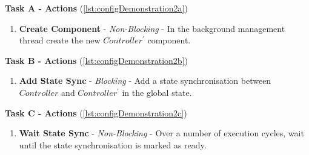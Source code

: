 \textbf{Task A - Actions} (\autoref{lst:configDemonstration2a})
 \begin{enumerate}
    \item \textbf{Create Component} - \textit{Non-Blocking} - In the background management thread create the new $Controller^{\prime}$ component.
\end{enumerate}

\textbf{Task B - Actions} (\autoref{lst:configDemonstration2b})
 \begin{enumerate}
    \item \textbf{Add State Sync} - \textit{Blocking} - Add a state synchronisation between $Controller$ and $Controller^{\prime}$ in the global state.
\end{enumerate}

\textbf{Task C - Actions} (\autoref{lst:configDemonstration2c})
 \begin{enumerate}
    \item \textbf{Wait State Sync} - \textit{Non-Blocking} - Over a number of execution cycles, wait until the state synchronisation is marked as ready.
\end{enumerate}

\clearpage

